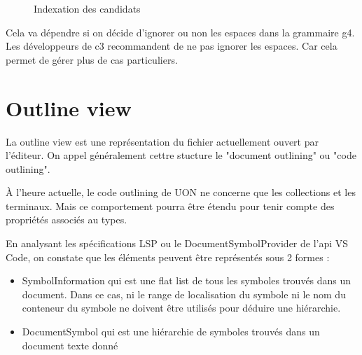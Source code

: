 \documentclass[
    iict, %
    il, %
]{heig-tb}
\begin{document}
\begin{figure}[!h]
    \begin{center}
    \end{center}
    \caption[Indexation des candidats]{\label{candidat-index} Indexation des candidats}
\end{figure}

Cela va dépendre si on décide d'ignorer ou non les espaces dans la grammaire g4.
Les développeurs de c3 recommandent de ne pas ignorer les espaces. Car cela permet de gérer plus de cas particuliers.

\section{Outline view}

La outline view est une représentation du fichier actuellement ouvert par l'éditeur.
On appel généralement cettre stucture le "document outlining" ou "code outlining".

À l'heure actuelle, le code outlining de UON ne concerne que les collections et les terminaux.
Mais ce comportement pourra être étendu pour tenir compte des propriétés associés au types.

En analysant les spécifications LSP ou le DocumentSymbolProvider de l'api VS Code, on constate que les
éléments peuvent être représentés sous 2 formes :

\begin{itemize}
    \item SymbolInformation qui est une flat list de tous les symboles trouvés dans un document. Dans ce cas, ni le range de localisation du symbole ni le nom du conteneur du symbole ne doivent être utilisés pour déduire une hiérarchie.
    \item DocumentSymbol qui est une hiérarchie de symboles trouvés dans un document texte donné
\end{itemize}
\end{document}
